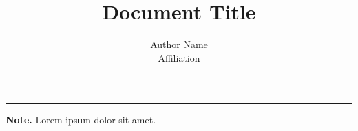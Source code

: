 \documentclass	[a4paper,11pt, hidelinks]{article}
\date			{\displaydate{date}}
\title{Document Title}
\author{ 
	Author Name\\
	\small{Affiliation}\\
}
\theoremstyle{definition}
\begin{document}
\maketitle
\thispagestyle{fancy}


\vspace*{\fill}
\rule{\textwidth}{0.4pt}
\footnotesize \textbf{Note.} Lorem ipsum dolor sit amet.
\end{document}
